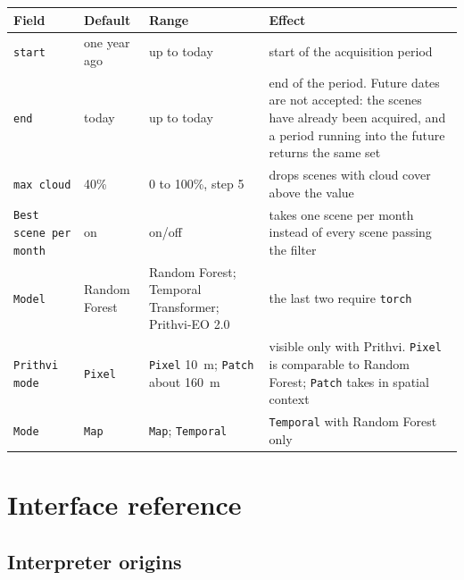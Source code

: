 \documentclass[12pt,a4paper]{article}
\begin{document}
\begin{center}
\label{tab:classify}
\small
\renewcommand{\arraystretch}{1.18}
\begin{tabular}{@{}L{3.0cm}L{2.7cm}L{3.0cm}L{6.6cm}@{}}
\toprule
\textbf{Field} & \textbf{Default} & \textbf{Range} & \textbf{Effect} \\
\midrule
\texttt{start} & one year ago & up to today & start of the acquisition period \\
\texttt{end} & today & up to today & end of the period. Future dates are not accepted: the scenes have already been acquired, and a period running into the future returns the same set \\
\texttt{max cloud} & 40\% & 0 to 100\%, step 5 & drops scenes with cloud cover above the value \\
\texttt{Best scene per month} & on & on/off & takes one scene per month instead of every scene passing the filter \\
\texttt{Model} & Random Forest & Random Forest; Temporal Transformer; Prithvi-EO 2.0 & the last two require \texttt{torch} \\
\texttt{Prithvi mode} & \texttt{Pixel} & \texttt{Pixel} 10~m; \texttt{Patch} about 160~m & visible only with Prithvi. \texttt{Pixel} is comparable to Random Forest; \texttt{Patch} takes in spatial context \\
\texttt{Mode} & \texttt{Map} & \texttt{Map}; \texttt{Temporal} & \texttt{Temporal} with Random Forest only \\
\bottomrule
\end{tabular}
\end{center}

\section{Interface reference}

\subsection{Interpreter origins}
\end{document}
